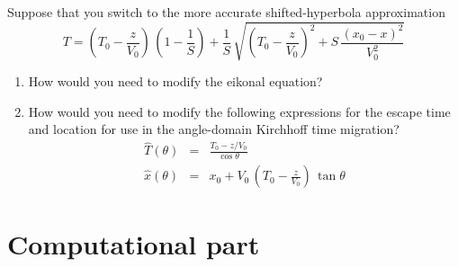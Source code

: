 \begin{enumerate}
Suppose that you switch to the more accurate shifted-hyperbola approximation
\begin{equation}
T = \left(T_0-\frac{z}{V_0}\right)\,(1-\frac{1}{S}) + \frac{1}{S}\,\sqrt{\left(T_0-\frac{z}{V_0}\right)^2 + S\,\frac{(x_0-x)^2}{V_0^2}}
\end{equation}

\begin{enumerate}
\item How would you need to modify the eikonal equation?
\item How would you need to modify the following expressions for the escape time and location for use in the angle-domain Kirchhoff time migration?
\begin{eqnarray}
\hat{T}(\theta) & = & \frac{T_0-z/V_0}{\cos{\theta}} \\
\hat{x}(\theta) & = & x_0 + V_0\,\left(T_0-\frac{z}{V_0}\right)\,\tan{\theta}
\end{eqnarray}

\end{enumerate}

\end{enumerate}

\newpage

\section{Computational part}

